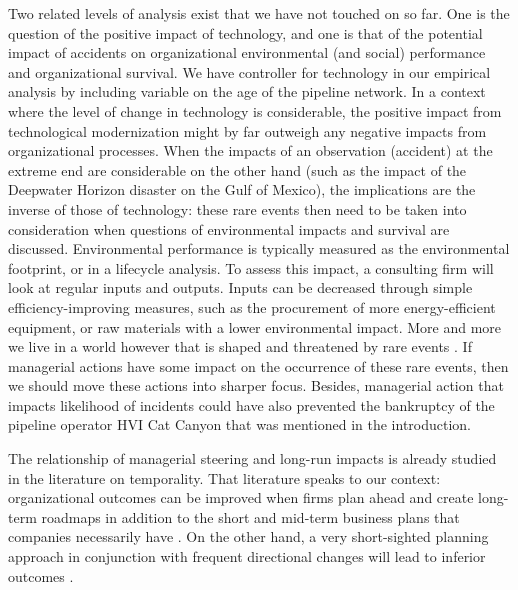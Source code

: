 Two related levels of analysis exist that we have not touched on so far. One is the question of the positive impact of technology, and one is that of the potential impact of accidents on organizational environmental (and social) performance and organizational survival. We have controller for technology in our empirical analysis by including variable on the age of the pipeline network. In a context where the level of change in technology is considerable, the positive impact from technological modernization might by far outweigh any negative impacts from organizational processes.  When the impacts of an observation (accident) at the extreme end are considerable on the other hand (such as the impact of the Deepwater Horizon disaster on the Gulf of Mexico), the implications are the inverse of those of technology: these rare events then need to be taken into consideration when questions of environmental impacts and survival are discussed. Environmental performance is typically measured as the environmental footprint, or in a lifecycle analysis. To assess this impact, a consulting firm will look at regular inputs and outputs. Inputs can be decreased through simple efficiency-improving measures, such as the procurement of more energy-efficient equipment, or raw materials with a lower environmental impact. More and more we live in a world however that is shaped and threatened by rare events \citep{Beck1992}. If managerial actions have some impact on the occurrence of these rare events, then we should move these actions into sharper focus. Besides, managerial action that impacts likelihood of incidents could have also prevented the bankruptcy of the pipeline operator HVI Cat Canyon that was mentioned in the introduction.

The relationship of managerial steering and long-run impacts is already studied in the literature on temporality. That literature speaks to our context: organizational outcomes can be improved when firms plan ahead and create long-term roadmaps in addition to the short and mid-term business plans that companies necessarily have \citep{Slawinski2015}. On the other hand, a very short-sighted planning approach in conjunction with frequent directional changes will lead to inferior outcomes \citep{Bansal2014, Morales-Raya2015}.

